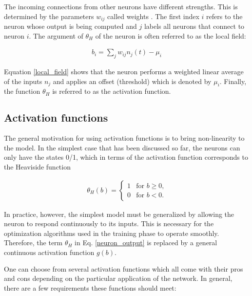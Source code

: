 The incoming connections from other neurons have different strengths. This is determined by the parameters $ w_{ij} $ called weights . The first index $ i $ refers to the neuron whose output is being computed and $ j $ labels all neurons that connect
to neuron $ i $. The argument of $ \theta_H $ of the neuron is often referred to as the local field: \cite{mehlig}

\begin{gather}
\label{local_field}
b_i = \sum\limits_{j}w_{ij}n_j(t) - \mu_i
\end{gather}

Equation \eqref{local_field} shows that the neuron performs a weighted linear average of the inputs $ n_j $ and applies an offset (threshold) which is denoted by $ \mu_i $. Finally, the function $ \theta_H $ is referred to as the activation function. \cite{mehlig}

\subsection{Activation functions}

The general motivation for using activation functions is to bring non-linearity to the model. In the simplest case that has been discussed so far, the neurons can only have the states 0/1, which in terms of the activation function corresponds to the Heaviside function 

\begin{gather}
	\theta_H(b) = 
	\begin{cases}	
	1 & \text{for $b \geq 0$,}\\
	0 & \text{for $b < 0$.}
	\end{cases} 
\end{gather}

\noindent In practice, however, the simplest model must be generalized by allowing the neuron to respond continuously to its inputs. This is necessary for the optimization algorithms used in the training phase to operate smoothly. Therefore, the term $ \theta_H $ in Eq. \eqref{neuron_output} is replaced by a general continuous activation function $ g(b) $. \cite{mehlig}

\newpage

One can choose from several activation functions which all come with their pros and cons depending on the particular application of the network. In general, there are a few requirements these functions should meet: \cite{groman}

